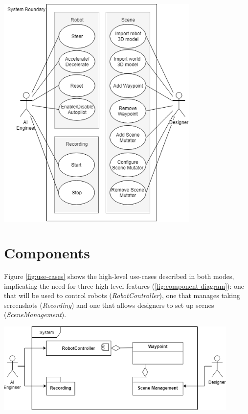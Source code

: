 \begin{center}
\noindent\includegraphics[width=10cm]{tex/img/ch04/Use_Cases_05.png}
\label{fig:use-cases}
\end{center}

\section{Components}
Figure \ref{fig:use-cases} shows the high-level use-cases described in both modes, implicating the need for three high-level features (\ref{fig:component-diagram}): one that will be used to control robots (\textit{RobotController}), one that manages taking screenshots (\textit{Recording}) and one that allows designers to set up scenes (\textit{SceneManagement}).

\begin{center}
\noindent\includegraphics[width=12cm]{tex/img/ch04/Component_Diagram01.png}
\label{fig:component-diagram}
\end{center}

